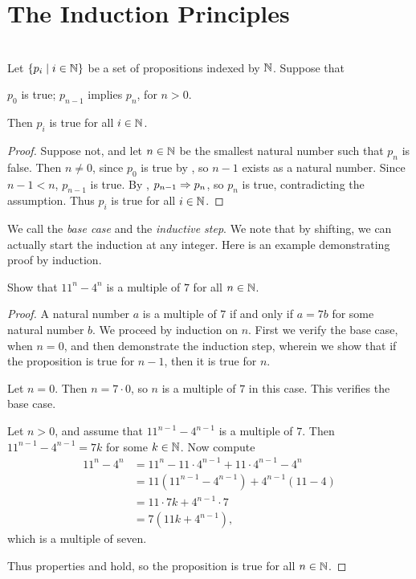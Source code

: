 \documentclass{amsart}
\begin{document}
\newpage

\section{The Induction Principles}

\begin{Prop}  \\
Let $\{ p_i \mid i \in \mathbb{N} \}$ be a set of propositions indexed by
$\mathbb{N}$. Suppose that
\begin{itemize}
 $p_0$ is true;  $p_{n-1}$ implies $p_n$, for
$n>0$.
\end{itemize}
Then $p_i$ is true for all $i \in \mathbb{N}$.
\end{Prop}

\begin{proof}
Suppose not, and let $n \in \mathbb{N}$ be the smallest natural number
such that $p_n$ is false.  Then $n \ne 0$, since $p_0$ is true by
, so $n-1$ exists as a natural number.  Since $n-1 < n$,
$p_{n-1}$ is true. By , $p_{n-1} \Rightarrow p_{n}$, so $p_{n}$
is true, contradicting the assumption. Thus $p_i$ is true for all
$i \in \mathbb{N}$.
\end{proof}

We call  the {\em base case} and  the {\em
inductive step}. We note that by shifting, we can actually start
the induction at any integer. Here is an example demonstrating
proof by induction.

\begin{Exm}
Show that $11^n - 4^n$ is a multiple of $7$ for all $n \in \mathbb{N}$.
\end{Exm}

\begin{proof}
A natural number $a$ is a multiple of $7$ if and only if $a = 7b$
for some natural number $b$. We proceed by induction on $n$.
First we verify the base case, when $n = 0$, and then demonstrate
the induction step, wherein we show that if the proposition is
true for $n-1$, then it is true for $n$.

 Let $n=0$.  Then $n = 7 \cdot 0$, so $n$ is a multiple
of $7$ in this case. This verifies the base case.

 Let $n > 0$, and assume that $11^{n-1} - 4^{n-1}$ is a
multiple of $7$. Then $11^{n-1} - 4^{n-1} = 7k$ for some $k \in
\mathbb{N}$. Now compute
\begin{align*}
11^n - 4^n
    &= 11^n - 11 \cdot 4^{n-1} + 11 \cdot 4^{n-1} - 4^{n} \\
    &= 11(11^{n-1} - 4^{n-1}) + 4^{n-1}(11-4) \\
    &= 11 \cdot 7k + 4^{n-1} \cdot 7 \\
    &= 7(11k+4^{n-1}) ,
\end{align*}
which is a multiple of seven.

Thus properties  and  hold, so the proposition
is true for all $n \in \mathbb{N}$.
\end{proof}
\end{document}
